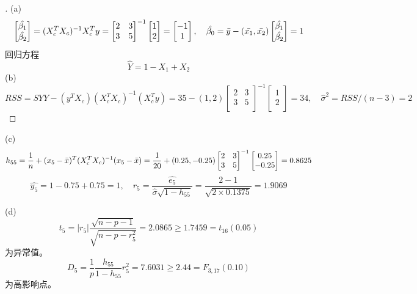 \documentclass[cn,hazy,green,12pt,normal]{elegantnote}
\numberwithin{equation}{section}
\numberwithin{subsection}{section}
\begin{document}
\begin{proof}[\solutionname]
(a) \[\begin{bmatrix}
    \hat{\beta_1}\\
    \hat{\beta_2}\\
\end{bmatrix}=(X_c^TX_c)^{-1}X_c^Ty=\begin{bmatrix}
    2&3\\
    3&5\\
\end{bmatrix}^{-1}\begin{bmatrix}
    1\\
    2\\
\end{bmatrix}=\begin{bmatrix}
    -1\\
    1\\
\end{bmatrix},\quad \hat{\beta_0}=\Bar{y}-(\Bar{x_1},\Bar{x_2})\begin{bmatrix}
    \hat{\beta_1}\\
    \hat{\beta_2}\\
\end{bmatrix}=1\]
回归方程
\[\hat{Y}=1-X_1+X_2\]
\noindent (b) \[RSS=SYY-(y^TX_c)(X_c^TX_c)^{-1}(X_c^Ty)=35-(1,2)\begin{bmatrix}
    2&3\\
    3&5\\
\end{bmatrix}^{-1}\begin{bmatrix}
    1\\
    2\\
\end{bmatrix}=34,\quad \hat{\sigma}^2=RSS/(n-3)=2\]
\end{proof}

\noindent (c) \[h_{55}=\frac{1}{n}+(x_5-\Bar{x})^T(X_c^TX_c)^{-1}(x_5-\Bar{x})=\dfrac{1}{20}+(0.25,-0.25)\begin{bmatrix}
    2&3\\
    3&5\\
\end{bmatrix}^{-1}\begin{bmatrix}
    0.25\\
    -0.25\\
\end{bmatrix}=0.8625\]
\[\hat{y_5}=1-0.75+0.75=1,\quad r_5=\dfrac{\hat{e_5}}{\hat{\sigma}\sqrt{1-h_{55}}}=\dfrac{2-1}{\sqrt{2\times 0.1375}}=1.9069\]

\noindent (d)\[t_5 = |r_5|\dfrac{\sqrt{n-p-1}}{\sqrt{n-p-r_5^2}}=2.0865\ge 1.7459=t_{16}(0.05)\]为异常值。
\[D_5=\dfrac{1}{p}\dfrac{h_{55}}{1-h_{55}}r_5^2=7.6031\ge 2.44 = F_{3,17}(0.10)\]
为高影响点。
\newpage
\end{document}
